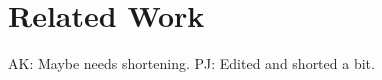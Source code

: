\documentclass[letterpaper, 10 pt, conference]{ieeeconf}  %
\begin{document}


\section{Related Work}
\label{sec:Related Work}

{\color{blue} AK: Maybe needs shortening.}
{\color{red} PJ: Edited and shorted a bit.}
\end{document}
